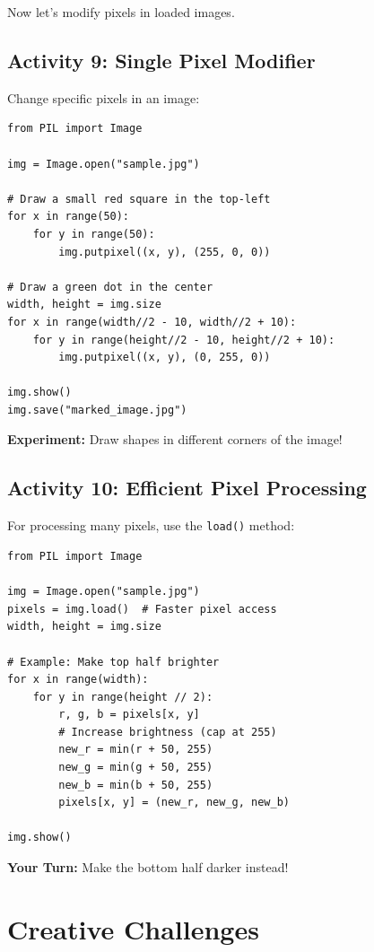 \documentclass[11pt]{article}
\begin{document}
Now let's modify pixels in loaded images.

\subsection*{Activity 9: Single Pixel Modifier}

Change specific pixels in an image:

\begin{lstlisting}
from PIL import Image

img = Image.open("sample.jpg")

# Draw a small red square in the top-left
for x in range(50):
    for y in range(50):
        img.putpixel((x, y), (255, 0, 0))

# Draw a green dot in the center
width, height = img.size
for x in range(width//2 - 10, width//2 + 10):
    for y in range(height//2 - 10, height//2 + 10):
        img.putpixel((x, y), (0, 255, 0))

img.show()
img.save("marked_image.jpg")
\end{lstlisting}

\textbf{Experiment:} Draw shapes in different corners of the image!

\subsection*{Activity 10: Efficient Pixel Processing}

For processing many pixels, use the \texttt{load()} method:

\begin{lstlisting}
from PIL import Image

img = Image.open("sample.jpg")
pixels = img.load()  # Faster pixel access
width, height = img.size

# Example: Make top half brighter
for x in range(width):
    for y in range(height // 2):
        r, g, b = pixels[x, y]
        # Increase brightness (cap at 255)
        new_r = min(r + 50, 255)
        new_g = min(g + 50, 255)
        new_b = min(b + 50, 255)
        pixels[x, y] = (new_r, new_g, new_b)

img.show()
\end{lstlisting}

\textbf{Your Turn:} Make the bottom half darker instead!

\section{Creative Challenges}
\end{document}
